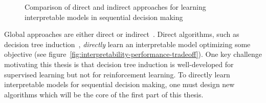 \begin{figure}[htbp]
    \caption{Comparison of direct and indirect approaches for learning interpretable models in sequential decision making}
    \label{fig:direct-vs-indirect-methods}
\end{figure}

Global approaches are either direct or indirect~\cite{milani-survey}. 
Direct algorithms, such as decision tree induction~\cite{breiman1984classification}, \textit{directly} learn an interpretable model optimizing some objective (see figure~\ref{fig:interpretability-performance-tradeoff}).
One key challenge motivating this thesis is that decision tree induction is well-developed for supervised learning but not for reinforcement learning.
To directly learn interpretable models for sequential decision making, one must design new algorithms which will be the core of the first part of this thesis. 

